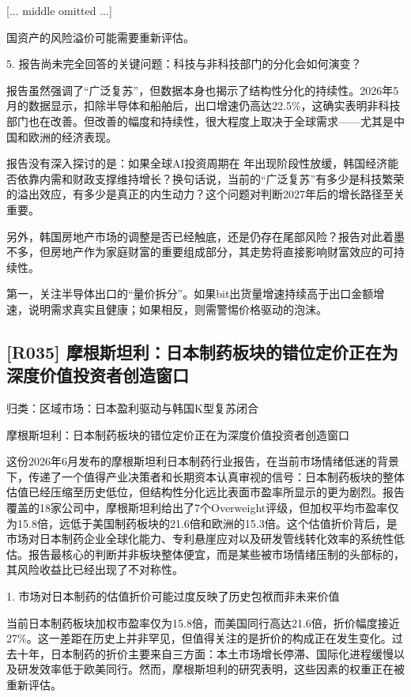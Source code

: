 \documentclass[11pt]{ctexart}
\begin{document}
[... middle omitted ...]

国资产的风险溢价可能需要重新评估。

5. 报告尚未完全回答的关键问题：科技与非科技部门的分化会如何演变？

报告虽然强调了“广泛复苏”，但数据本身也揭示了结构性分化的持续性。2026年5月的数据显示，扣除半导体和船舶后，出口增速仍高达22.5\%，这确实表明非科技部门也在改善。但改善的幅度和持续性，很大程度上取决于全球需求——尤其是中国和欧洲的经济表现。

报告没有深入探讨的是：如果全球AI投资周期在 年出现阶段性放缓，韩国经济能否依靠内需和财政支撑维持增长？换句话说，当前的“广泛复苏”有多少是科技繁荣的溢出效应，有多少是真正的内生动力？这个问题对判断2027年后的增长路径至关重要。

另外，韩国房地产市场的调整是否已经触底，还是仍存在尾部风险？报告对此着墨不多，但房地产作为家庭财富的重要组成部分，其走势将直接影响财富效应的可持续性。

第一，关注半导体出口的“量价拆分”。如果bit出货量增速持续高于出口金额增速，说明需求真实且健康；如果相反，则需警惕价格驱动的泡沫。

\subsection{[R035] 摩根斯坦利：日本制药板块的错位定价正在为深度价值投资者创造窗口}
{\small\color{refgray}归类：区域市场：日本盈利驱动与韩国K型复苏闭合}

摩根斯坦利：日本制药板块的错位定价正在为深度价值投资者创造窗口

这份2026年6月发布的摩根斯坦利日本制药行业报告，在当前市场情绪低迷的背景下，传递了一个值得产业决策者和长期资本认真审视的信号：日本制药板块的整体估值已经压缩至历史低位，但结构性分化远比表面市盈率所显示的更为剧烈。报告覆盖的18家公司中，摩根斯坦利给出了7个Overweight评级，但加权平均市盈率仅为15.8倍，远低于美国制药板块的21.6倍和欧洲的15.3倍。这个估值折价背后，是市场对日本制药企业全球化能力、专利悬崖应对以及研发管线转化效率的系统性低估。报告最核心的判断并非板块整体便宜，而是某些被市场情绪压制的头部标的，其风险收益比已经出现了不对称性。

1. 市场对日本制药的估值折价可能过度反映了历史包袱而非未来价值

当前日本制药板块加权市盈率仅为15.8倍，而美国同行高达21.6倍，折价幅度接近27\%。这一差距在历史上并非罕见，但值得关注的是折价的构成正在发生变化。过去十年，日本制药的折价主要来自三方面：本土市场增长停滞、国际化进程缓慢以及研发效率低于欧美同行。然而，摩根斯坦利的研究表明，这些因素的权重正在被重新评估。
\end{document}
